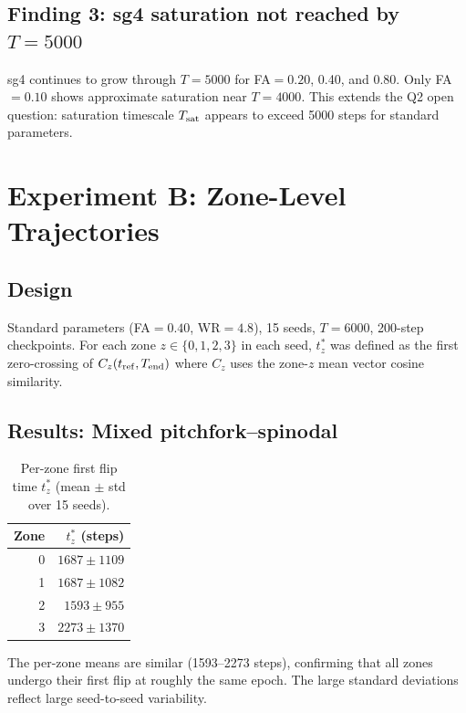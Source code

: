 \documentclass[11pt,a4paper]{article}
\begin{document}
\subsection{Finding 3: sg4 saturation not reached by $T=5000$}

sg4 continues to grow through $T=5000$ for FA$=0.20$, 0.40, and 0.80.
Only FA$=0.10$ shows approximate saturation near $T=4000$.
This extends the Q2 open question: saturation timescale $T_{\rm sat}$ appears
to exceed 5000 steps for standard parameters.

\section{Experiment B: Zone-Level Trajectories}

\subsection{Design}

Standard parameters (FA$=0.40$, WR$=4.8$), 15 seeds, $T=6000$, 200-step
checkpoints.  For each zone $z \in \{0,1,2,3\}$ in each seed, $t^*_z$ was
defined as the first zero-crossing of $C_z(t_{\rm ref}, T_{\rm end})$ where
$C_z$ uses the zone-$z$ mean vector cosine similarity.

\subsection{Results: Mixed pitchfork--spinodal}

\begin{table}[h]
\centering
\caption{Per-zone first flip time $t^*_z$ (mean $\pm$ std over 15 seeds).}
\label{tab:zones}
\begin{tabular}{rr}
\toprule
Zone & $t^*_z$ (steps) \\
\midrule
0 & $1687 \pm 1109$ \\
1 & $1687 \pm 1082$ \\
2 & $1593 \pm 955$ \\
3 & $2273 \pm 1370$ \\
\bottomrule
\end{tabular}
\end{table}

The per-zone means are similar (1593--2273 steps), confirming that all zones
undergo their first flip at roughly the same epoch.  The large standard deviations
reflect large seed-to-seed variability.
\end{document}
